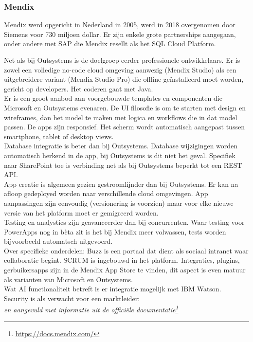 \subsubsection{Mendix}

Mendix werd opgericht in Nederland in 2005, werd in 2018 overgenomen door Siemens voor 730 miljoen dollar. Er zijn enkele grote partnerships aangegaan, onder andere met SAP die Mendix resellt als het SQL Cloud Platform.

Net als bij Outsystems is de doelgroep eerder professionele ontwikkelaars. Er is zowel een volledige no-code cloud omgeving aanwezig (Mendix Studio) als een uitgebreidere variant (Mendix Studio Pro) die offline geïnstalleerd moet worden, gericht op developers. Het coderen gaat met Java.\\
Er is een groot aanbod aan voorgebouwde templates en componenten die Microsoft en Outsystems evenaren.
De UI filosofie is om te starten met design en wireframes, dan het model te maken met logica en workflows die in dat model passen. De apps zijn responsief. Het scherm wordt automatisch aangepast tussen smartphone, tablet of desktop views.\\
Database integratie is beter dan bij Outsystems. Database wijzigingen worden automatisch herkend in de app, bij Outsystems is dit niet het geval. Specifiek naar SharePoint toe is verbinding net als bij Outsystems beperkt tot een REST API.\\
App creatie is algemeen gezien gestroomlijnder dan bij Outsystems. Er kan na afloop gedeployed worden naar verschillende cloud omgevingen. %
App aanpassingen zijn eenvoudig (versionering is voorzien) maar voor elke nieuwe versie van het platform moet er gemigreerd worden.\\
Testing en analystics zijn geavanceerder dan bij concurrenten. Waar testing voor PowerApps nog in bèta zit is het bij Mendix meer volwassen, tests worden bijvoorbeeld automatsch uitgevoerd.\\
Over specifieke onderdelen: Buzz is een portaal dat dient als sociaal intranet waar collaboratie begint. SCRUM is ingebouwd in het platform. Integraties, plugins, gerbuikersapps zijn in de Mendix App Store te vinden, dit aspect is even matuur als varianten van Microsoft en Outsystems.\\
Wat AI functionaliteit betreft is er integratie mogelijk met IBM Watson.\\
Security is als verwacht voor een marktleider: \\ %
\autocite{Marvin2017a} \textit{en aangevuld met informatie uit de officiële documentatie\footnote{\url{https://docs.mendix.com/}}}


